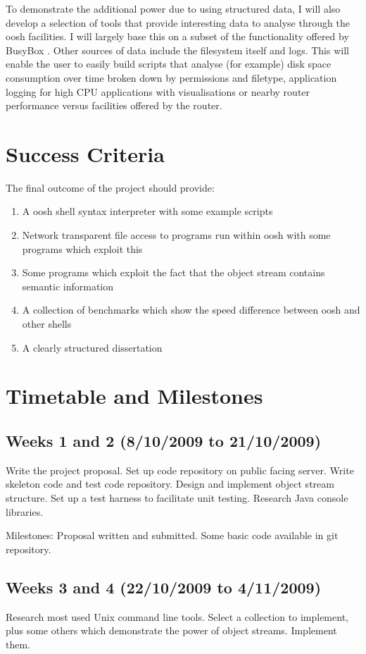 \documentclass[12pt]{article}
\begin{document}
To demonstrate the additional power due to using structured data, I
will also develop a selection of tools that provide interesting data
to analyse through the oosh facilities. I will largely base this on a
subset of the functionality offered by BusyBox \cite{busybox}. Other
sources of data include the filesystem itself and logs. This will
enable the user to easily build scripts that analyse (for example)
disk space consumption over time broken down by permissions and
filetype, application logging for high CPU applications with
visualisations or nearby router performance versus facilities offered
by the router.

\section*{Success Criteria}
The final outcome of the project should provide:

\begin{enumerate}
\item A oosh shell syntax interpreter with some example scripts
\item Network transparent file access to programs run within oosh with
  some programs which exploit this
\item Some programs which exploit the fact that the object stream
  contains semantic information
\item A collection of benchmarks which show the speed difference
  between oosh and other shells
\item A clearly structured dissertation
\end{enumerate}

\section*{Timetable and Milestones}

\subsection*{Weeks 1 and 2 (8/10/2009 to 21/10/2009)}
Write the project proposal. Set up code repository on public facing
server. Write skeleton code and test code repository. Design and
implement object stream structure. Set up a test harness to facilitate
unit testing. Research Java console libraries.

Milestones: Proposal written and submitted. Some basic code available
in git repository.

\subsection*{Weeks 3 and 4 (22/10/2009 to 4/11/2009)}
Research most used Unix command line tools. Select a collection to
implement, plus some others which demonstrate the power of object
streams. Implement them.
\end{document}
